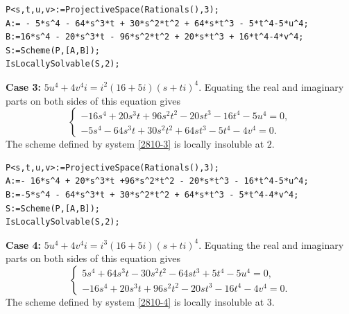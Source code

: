 \documentclass[a4paper,12pt,english,reqno]{amsart}
\begin{document}

\begin{lstlisting}
P<s,t,u,v>:=ProjectiveSpace(Rationals(),3);
A:= - 5*s^4 - 64*s^3*t + 30*s^2*t^2 + 64*s*t^3 - 5*t^4-5*u^4;
B:=16*s^4 - 20*s^3*t - 96*s^2*t^2 + 20*s*t^3 + 16*t^4-4*v^4;
S:=Scheme(P,[A,B]);
IsLocallySolvable(S,2);
\end{lstlisting}



{\bf Case 3:} $5u^4+4v^4i=i^{2}(16+5i)(s+ti)^4$. Equating the real and imaginary parts on both sides of this equation gives
\begin{equation}\label{2810-3}
\begin{cases}
-16s^4 + 20s^3t + 96s^2t^2 - 20st^3 - 16t^4 - 5u^4=0,\\
-5s^4 - 64s^3t + 30s^2t^2 + 64st^3 - 5t^4 - 4v^4=0.
\end{cases}
\end{equation}
The scheme defined by system \eqref{2810-3} is locally insoluble at $2$.

\begin{lstlisting}
P<s,t,u,v>:=ProjectiveSpace(Rationals(),3);
A:=- 16*s^4 + 20*s^3*t +96*s^2*t^2 - 20*s*t^3 - 16*t^4-5*u^4;
B:=-5*s^4 - 64*s^3*t + 30*s^2*t^2 + 64*s*t^3 - 5*t^4-4*v^4;
S:=Scheme(P,[A,B]);
IsLocallySolvable(S,2);
\end{lstlisting}


{\bf Case 4:} $5u^4+4v^4i=i^{3}(16+5i)(s+ti)^4$. Equating the real and imaginary parts on both sides of this equation gives
\begin{equation}\label{2810-4}
\begin{cases}
5s^4 + 64s^3t - 30s^2t^2 - 64st^3 + 5t^4 - 5u^4=0,\\
-16s^4 + 20s^3t + 96s^2t^2 - 20st^3 - 16t^4 - 4v^4=0.
\end{cases}
\end{equation}
The scheme defined by system \eqref{2810-4} is locally insoluble at $3$.
\end{document}
